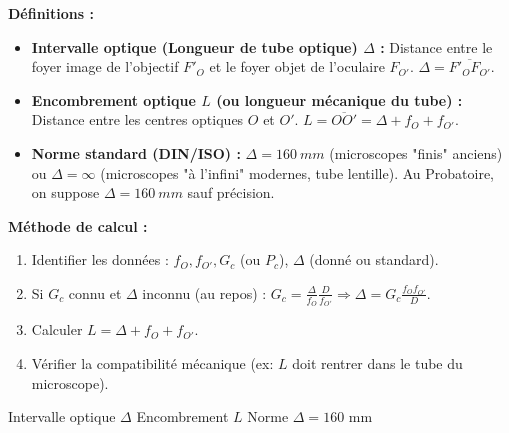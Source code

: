 \documentclass[11pt]{article}
\newcommand{\cle}[1]{{\popxbold\color{popdark}#1}}
\begin{document}
\begin{methode}
\textbf{Définitions :}
\begin{itemize}
    \item \textbf{Intervalle optique (Longueur de tube optique) $\Delta$ :} Distance entre le foyer image de l'objectif $F'_O$ et le foyer objet de l'oculaire $F_{O'}$. $\Delta = \overline{F'_O F_{O'}}$.
    \item \textbf{Encombrement optique $L$ (ou longueur mécanique du tube) :} Distance entre les centres optiques $O$ et $O'$. $L = \overline{OO'} = \Delta + f_O + f_{O'}$.
    \item \textbf{Norme standard (DIN/ISO) :} $\Delta = \SI{160}{mm}$ (microscopes "finis" anciens) ou $\Delta = \infty$ (microscopes "à l'infini" modernes, tube lentille). Au Probatoire, on suppose $\Delta = \SI{160}{mm}$ sauf précision.
\end{itemize}
\textbf{Méthode de calcul :}
\begin{enumerate}
    \item Identifier les données : $f_O, f_{O'}, G_c$ (ou $P_c$), $\Delta$ (donné ou standard).
    \item Si $G_c$ connu et $\Delta$ inconnu (au repos) : $G_c = \frac{\Delta}{f_O} \frac{D}{f_{O'}} \Rightarrow \Delta = G_c \frac{f_O f_{O'}}{D}$.
    \item Calculer $L = \Delta + f_O + f_{O'}$.
    \item Vérifier la compatibilité mécanique (ex: $L$ doit rentrer dans le tube du microscope).
\end{enumerate}
\cle{Intervalle optique $\Delta$} \cle{Encombrement $L$} \cle{Norme $\Delta = 160$ mm}
\end{methode}
\end{document}
